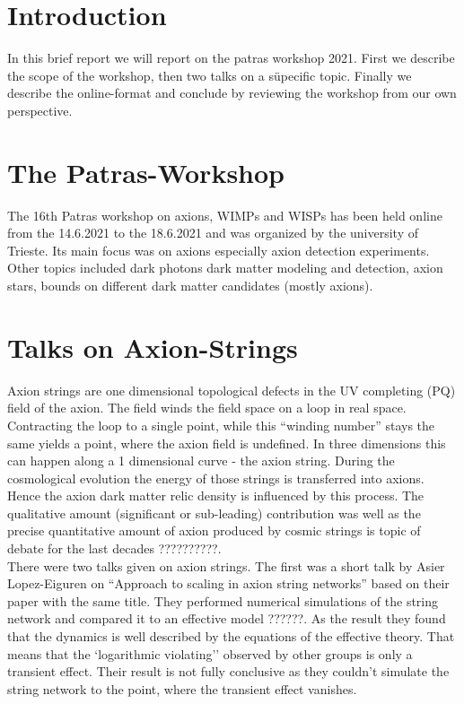 \documentclass[a4paper]{article}
\begin{document}
\section{Introduction}
In this brief report we will report on the patras workshop 2021.
First we describe the scope of the workshop, then two talks on a süpecific topic.
Finally we describe the online-format and conclude by reviewing the workshop from our own perspective.

\section{The Patras-Workshop}
The 16th Patras workshop on axions, WIMPs and WISPs has been held online from the 14.6.2021 to the 18.6.2021 and was organized by the university of Trieste.
Its main focus was on axions especially axion detection experiments.
Other topics included dark photons dark matter modeling and
detection,  axion stars,  bounds on different dark matter candidates (mostly axions).

\section{Talks on Axion-Strings}
Axion strings are one dimensional topological defects in the UV completing
(PQ) field of the axion. The field winds the field space on a loop
in real space. Contracting the loop to a single point, while this ``winding number'' stays the same yields a point, where the axion field is undefined. In three dimensions this can happen along a 1 dimensional curve - the axion string.
During the cosmological evolution the energy of those strings is transferred into axions.
Hence the axion dark matter relic density is influenced by this process.
The qualitative amount (significant or sub-leading) contribution was well as the precise quantitative amount
of axion produced by cosmic strings is topic of debate for the last decades ??????????. \\


\noindent
There were two talks given on axion strings.
The first was a short talk by Asier Lopez-Eiguren on ``Approach to scaling in axion string networks'' based on their paper with the same title.
They performed numerical simulations of the string network and compared it to an effective
model ??????. As the result they found that the dynamics is well described by the equations of the effective theory. That means that the `logarithmic violating'' observed by other groups is only a transient effect.
Their result is not fully conclusive as they couldn't simulate the string network to the point, where
the transient effect vanishes. \\
\end{document}
